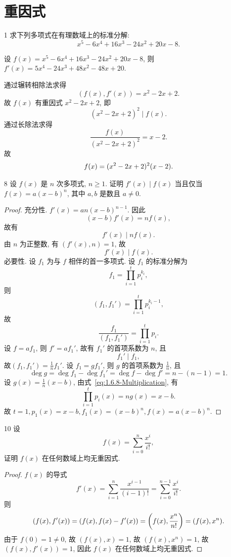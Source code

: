 
\renewcommand{\thesection}{1.6}

\section{重因式}\label{sec:1.6}

\begin{ex}{1}\label{ex:1.6.1}
    求下列多项式在有理数域上的标准分解:
    \[
    x^5-6x^4+16x^3-24x^2+20x-8.
    \]
\end{ex}

\begin{solution}
    设 \(f(x)=x^5-6x^4+16x^3-24x^2+20x-8\), 则 \(f'(x)=5x^4-24x^3+48x^2-48x+20\).

    通过辗转相除法求得
    \[
    (f(x),f'(x))=x^2-2x+2.
    \]
    故 \(f(x)\) 有重因式 \(x^2-2x+2\), 即
    \[
    (x^2-2x+2)^2\mid f(x).
    \]
    通过长除法求得
    \[
    \frac{f(x)}{(x^2-2x+2)^2}=x-2.
    \]
    故
    \[
    f(x)=(x^2-2x+2)^2(x-2).\qedhere
    \]
\end{solution}

\begin{ex}{8}\label{ex:1.6.8}
    设 \(f(x)\) 是 \(n\) 次多项式, \(n\geq1\).
    证明 \(f'(x)\mid f(x)\) 当且仅当 \(f(x)=a(x-b)^n\),
    其中 \(a,b\) 是数且 \(a\neq0\).
\end{ex}

\begin{proof}
    充分性. \(f'(x)=an(x-b)^{n-1}\).
    因此
    \[
    (x-b)f'(x)=nf(x),
    \]
    故有
    \[
    f'(x)\mid nf(x).
    \]
    由 \(n\) 为正整数, 有 \((f'(x),n)=1\), 故
    \[
    f'(x)\mid f(x).
    \]
    必要性. 设 \(f_1\) 为与 \(f\) 相伴的首一多项式. 设 \(f_1\) 的标准分解为
    \[
    f_1=\prod_{i=1}^{t}p_i^{k_i},
    \]
    则
    \[
    (f_1,f_1')=\prod_{i=1}^{t}p_i^{k_i-1},
    \]
    故
    \begin{equation}
        \frac{f_1}{(f_1,f_1')}=\prod_{i=1}^{t}p_i.
        \label{eq:1.6.8-Multiplication}
    \end{equation}
    设 \(f=af_1\), 则 \(f'=af_1'\), 故有 \(f_1'\) 的首项系数为 \(n\), 且
    \[
    f_1'\mid f_1,
    \]
    故\((f_1,f_1')=\frac{1}{n}f_1'\). 设 \(f_1=gf_1'\),
    则 \(g\) 的首项系数为 \(\frac{1}{n}\), 且
    \[
    \deg g=\deg f_1-\deg f_1'=\deg f-\deg f'=n-(n-1)=1.
    \]
    设 \(g(x)=\frac{1}{n}(x-b)\), 由式~\eqref{eq:1.6.8-Multiplication}, 有
    \[
    \prod_{i=1}^{t}p_i(x)=ng(x)=x-b.
    \]
    故 \(t=1,p_1(x)=x-b,f_1(x)=(x-b)^n,f(x)=a(x-b)^n\).
\end{proof}

\begin{ex}{10}\label{ex:1.6.10}
    设
    \[
    f(x)=\sum_{i=0}^n\frac{x^i}{i!},
    \]
    证明 \(f(x)\) 在任何数域上均无重因式.
\end{ex}

\begin{proof}
    \(f(x)\) 的导式
    \[
    f'(x)=\sum_{i=1}^n\frac{x^{i-1}}{(i-1)!}=\sum_{i=0}^{n-1}\frac{x^i}{i!}.
    \]
    则
    \[
    (f(x),f'(x))=(f(x),f(x)-f'(x))=\left(f(x),\frac{x^n}{n!}\right)=(f(x),x^n).
    \]
    由于 \(f(0)=1\neq0\), 故 \((f(x),x)=1\), 故 \((f(x),x^n)=1\),
    故 \((f(x),f'(x))=1\), 因此 \(f(x)\) 在任何数域上均无重因式.
\end{proof}